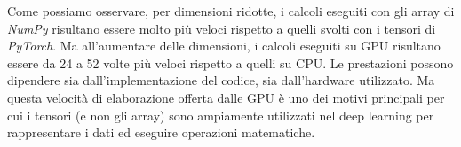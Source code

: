 Come possiamo osservare, per dimensioni ridotte, i calcoli eseguiti con gli array
di \textit{NumPy} risultano essere molto più veloci rispetto a quelli svolti 
con i tensori di \textit{PyTorch}.
Ma all'aumentare delle dimensioni, i calcoli eseguiti su GPU 
risultano essere da 24 a 52 volte più veloci rispetto a quelli su CPU.
Le prestazioni possono dipendere sia dall'implementazione del codice, sia 
dall'hardware utilizzato. Ma questa velocità di elaborazione offerta dalle GPU è uno 
dei motivi principali per cui i tensori (e non gli array) sono 
ampiamente utilizzati nel deep learning per rappresentare i dati ed eseguire operazioni 
matematiche.

